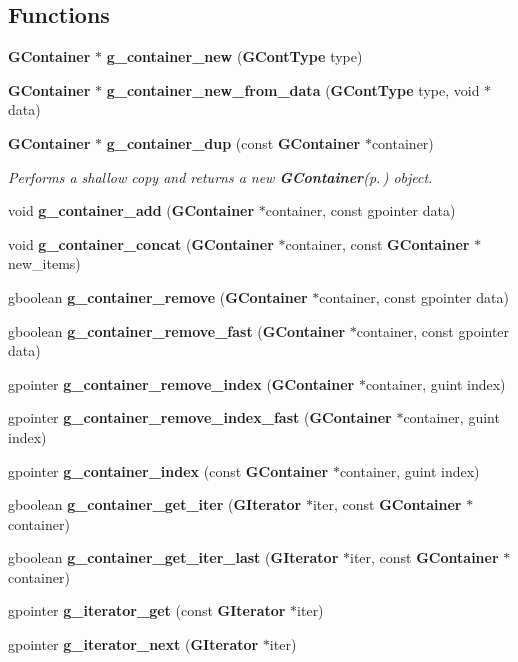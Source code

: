 \subsection*{Functions}
\begin{CompactItemize}
\item 
{\bf GContainer} $\ast$ {\bf g\_\-container\_\-new} ({\bf GCont\-Type} type)
\item 
{\bf GContainer} $\ast$ {\bf g\_\-container\_\-new\_\-from\_\-data} ({\bf GCont\-Type} type, void $\ast$data)
\item 
{\bf GContainer} $\ast$ {\bf g\_\-container\_\-dup} (const {\bf GContainer} $\ast$container)
\begin{CompactList}\small\item\em Performs a shallow copy and returns a new {\bf GContainer}{\rm (p.\,\pageref{structGContainer})} object. \item\end{CompactList}\item 
void {\bf g\_\-container\_\-add} ({\bf GContainer} $\ast$container, const gpointer data)
\item 
void {\bf g\_\-container\_\-concat} ({\bf GContainer} $\ast$container, const {\bf GContainer} $\ast$new\_\-items)
\item 
gboolean {\bf g\_\-container\_\-remove} ({\bf GContainer} $\ast$container, const gpointer data)
\item 
gboolean {\bf g\_\-container\_\-remove\_\-fast} ({\bf GContainer} $\ast$container, const gpointer data)
\item 
gpointer {\bf g\_\-container\_\-remove\_\-index} ({\bf GContainer} $\ast$container, guint index)
\item 
gpointer {\bf g\_\-container\_\-remove\_\-index\_\-fast} ({\bf GContainer} $\ast$container, guint index)
\item 
gpointer {\bf g\_\-container\_\-index} (const {\bf GContainer} $\ast$container, guint index)
\item 
gboolean {\bf g\_\-container\_\-get\_\-iter} ({\bf GIterator} $\ast$iter, const {\bf GContainer} $\ast$container)
\item 
gboolean {\bf g\_\-container\_\-get\_\-iter\_\-last} ({\bf GIterator} $\ast$iter, const {\bf GContainer} $\ast$container)
\item 
gpointer {\bf g\_\-iterator\_\-get} (const {\bf GIterator} $\ast$iter)
\item 
gpointer {\bf g\_\-iterator\_\-next} ({\bf GIterator} $\ast$iter)
\item 

\end{CompactItemize}
